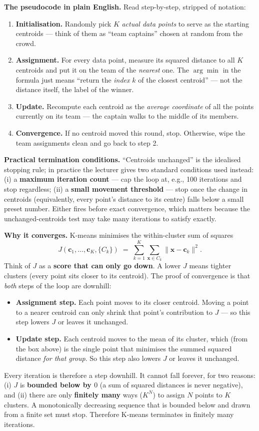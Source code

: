 \documentclass[11pt, a4paper]{article}
\begin{document}
\textbf{The pseudocode in plain English.} Read step-by-step, stripped of notation:
\begin{enumerate}
  \item \textbf{Initialisation.} Randomly pick $K$ \emph{actual data points} to serve as the starting centroids --- think of them as ``team captains'' chosen at random from the crowd.
  \item \textbf{Assignment.} For every data point, measure its squared distance to all $K$ centroids and put it on the team of the \emph{nearest} one. The $\arg\min$ in the formula just means ``return the \emph{index} $k$ of the closest centroid'' --- not the distance itself, the label of the winner.
  \item \textbf{Update.} Recompute each centroid as the \emph{average coordinate} of all the points currently on its team --- the captain walks to the middle of its members.
  \item \textbf{Convergence.} If no centroid moved this round, stop. Otherwise, wipe the team assignments clean and go back to step 2.
\end{enumerate}

\textbf{Practical termination conditions.} ``Centroids unchanged'' is the idealised stopping rule; in practice the lecturer gives two standard conditions used instead: (i) a \textbf{maximum iteration count} — cap the loop at, e.g., 100 iterations and stop regardless; (ii) a \textbf{small movement threshold} — stop once the change in centroids (equivalently, every point's distance to its centre) falls below a small preset number. Either fires before exact convergence, which matters because the unchanged-centroids test may take many iterations to satisfy exactly.

\textbf{Why it converges.} K-means minimises the within-cluster sum of squares
\[
J(\mathbf{c}_1, \ldots, \mathbf{c}_K, \{C_k\}) \;=\; \sum_{k=1}^K \sum_{\mathbf{x}\in C_k} \|\mathbf{x} - \mathbf{c}_k\|^2.
\]
Think of $J$ as a \textbf{score that can only go down}. A lower $J$ means tighter clusters (every point sits closer to its centroid). The proof of convergence is that \emph{both} steps of the loop are downhill:
\begin{itemize}
  \item \textbf{Assignment step.} Each point moves to its closer centroid. Moving a point to a nearer centroid can only shrink that point's contribution to $J$ --- so this step lowers $J$ or leaves it unchanged.
  \item \textbf{Update step.} Each centroid moves to the mean of its cluster, which (from the box above) is the single point that minimises the summed squared distance \emph{for that group}. So this step also lowers $J$ or leaves it unchanged.
\end{itemize}
Every iteration is therefore a step downhill. It cannot fall forever, for two reasons: (i) $J$ is \textbf{bounded below by $0$} (a sum of squared distances is never negative), and (ii) there are only \textbf{finitely many} ways ($K^N$) to assign $N$ points to $K$ clusters. A monotonically decreasing sequence that is bounded below and drawn from a finite set must stop. Therefore K-means terminates in finitely many iterations.
\end{document}
